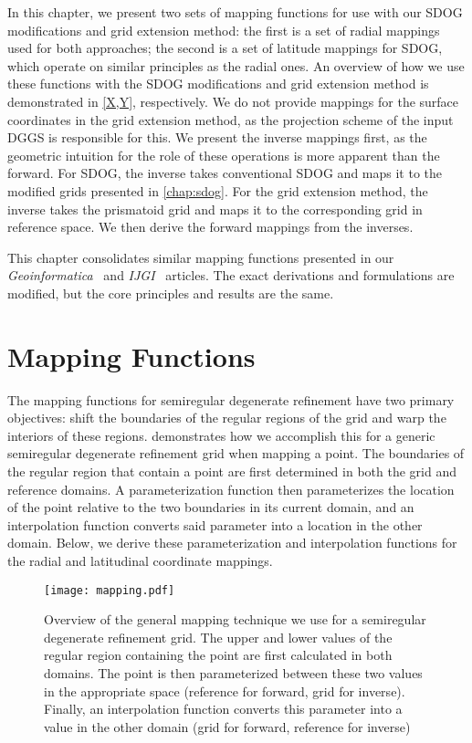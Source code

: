 In this chapter, we present two sets of mapping functions for use with our SDOG modifications and grid extension method:
the first is a set of radial mappings used for both approaches;
the second is a set of latitude mappings for SDOG, which operate on similar principles as the radial ones.
An overview of how we use these functions with the SDOG modifications and grid extension method is demonstrated in \cref{X,Y}, respectively.
We do not provide mappings for the surface coordinates in the grid extension method, as the projection scheme of the input DGGS is responsible for this.
We present the inverse mappings first, as the geometric intuition for the role of these operations is more apparent than the forward.
For SDOG, the inverse takes conventional SDOG and maps it to the modified grids presented in \cref{chap:sdog}.
For the grid extension method, the inverse takes the prismatoid grid and maps it to the corresponding grid in reference space.
We then derive the forward mappings from the inverses.


This chapter consolidates similar mapping functions presented in our \textit{Geoinformatica}~\cite{ulmer2020toward} and \textit{IJGI}~\cite{ulmer2020general} articles.
The exact derivations and formulations are modified, but the core principles and results are the same.


\section{Mapping Functions} \label{chap:6:functions}
The mapping functions for semiregular degenerate refinement have two primary objectives: shift the boundaries of the regular regions of the grid and warp the interiors of these regions.
 demonstrates how we accomplish this for a generic semiregular degenerate refinement grid when mapping a point.
The boundaries of the regular region that contain a point are first determined in both the grid and reference domains.
A parameterization function then parameterizes the location of the point relative to the two boundaries in its current domain, and an interpolation function converts said parameter into a location in the other domain.
Below, we derive these parameterization and interpolation functions for the radial and latitudinal coordinate mappings.


\begin{figure}[ht!]
	\centering
	\texttt{[image: mapping.pdf]}
	\caption[Overview of mapping for semiregular degenerate refinement grids]{
		Overview of the general mapping technique we use for a semiregular degenerate refinement grid.
		The upper and lower values of the regular region containing the point are first calculated in both domains.
		The point is then parameterized between these two values in the appropriate space (reference for forward, grid for inverse).
		Finally, an interpolation function converts this parameter into a value in the other domain (grid for forward, reference for inverse)
	}
	\label{fig:mapping}
\end{figure}


